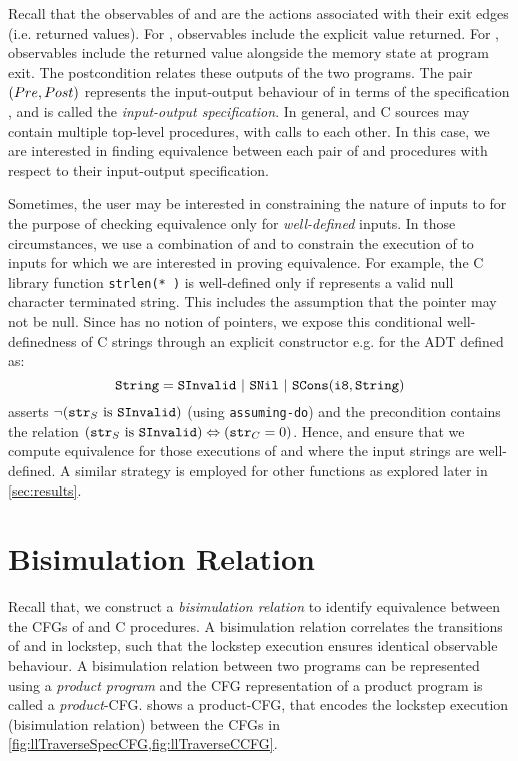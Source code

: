 Recall that the observables of \sprog{} and \cprog{} are the actions associated with their exit edges (i.e. returned values).
For \sprog{}, observables include the explicit value returned.
For \cprog{}, observables include the returned value alongside the memory state at program exit.
The postcondition \post{} relates these outputs of the two programs.
The pair $({Pre}{},{Post}{})$ represents the input-output behaviour of \cprog{} in terms of the specification \sprog{},
and is called the {\em input-output specification}.
In general, \SpecL{} and C sources may contain multiple top-level procedures, with calls to each other.
In this case, we are interested in finding equivalence between each pair
of \sprog{} and \cprog{} procedures with respect to their input-output specification.

Sometimes, the user may be interested in constraining the nature of inputs to \cprog{}
for the purpose of checking equivalence only for {\em well-defined} inputs.
In those circumstances, we use a combination of \pre{} and \sdef{} to constrain
the execution of \cprog{} to inputs for which we are interested in proving equivalence.
For example, the C library function {\tt strlen(* )} is well-defined only if 
represents a valid null character terminated string.
This includes the assumption that the pointer  may not be null.
Since \SpecL{} has no notion of pointers, we expose this conditional well-definedness of C strings
through an explicit constructor e.g.  for the  ADT defined as:
$$
\type{String}=\cons{SInvalid}\ |\ \cons{SNil}\ |\ \cons{SCons}(\type{i8}, \type{String})
$$
\sdef{} asserts $\neg({\tt str}_{S}\ \mathrm{is}\ {\tt SInvalid})$ (using {\tt assuming-do}) and
the precondition \pre{} contains the relation $({\tt str}_{S}\ \mathrm{is}\ {\tt SInvalid}) \Leftrightarrow ({\tt str}_{C}=0)$.
Hence, \sdef{} and \pre{} ensure that we compute equivalence for those
executions of \sprog{} and \cprog{} where the input strings are well-defined.
A similar strategy is employed for other functions as explored later in \cref{sec:results}.



\section{Bisimulation Relation}
\label{sec:bisim}
Recall that,
we construct a {\em bisimulation relation} to identify equivalence between the CFGs of \SpecL{} and C procedures.
A bisimulation relation correlates the transitions of \sprog{} and \cprog{} in lockstep, such that the
lockstep execution ensures identical observable behaviour.
A bisimulation relation between two programs can be represented using a {\em product program}
\cite{covac} and the CFG representation of a product program is called a {\em product}-CFG.
 shows a product-CFG, that encodes the lockstep execution
(bisimulation relation) between the CFGs in \cref{fig:llTraverseSpecCFG,fig:llTraverseCCFG}.

